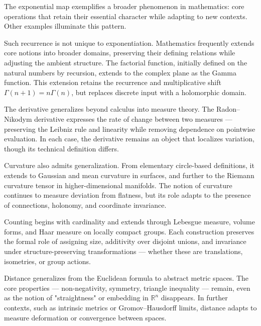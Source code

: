 \begin{commentary}[Generalizations]
The exponential map exemplifies a broader phenomenon in mathematics: core operations that retain their essential character while adapting to new contexts. Other examples illuminate this pattern.

Such recurrence is not unique to exponentiation. Mathematics frequently extends core notions into broader domains, preserving their defining relations while adjusting the ambient structure. The factorial function, initially defined on the natural numbers by recursion, extends to the complex plane as the Gamma function. This extension retains the recurrence and multiplicative shift \( \Gamma(n+1) = n\Gamma(n) \), but replaces discrete input with a holomorphic domain.

The derivative generalizes beyond calculus into measure theory. The Radon–Nikodym derivative expresses the rate of change between two measures — preserving the Leibniz rule and linearity while removing dependence on pointwise evaluation. In each case, the derivative remains an object that localizes variation, though its technical definition differs.

Curvature also admits generalization. From elementary circle-based definitions, it extends to Gaussian and mean curvature in surfaces, and further to the Riemann curvature tensor in higher-dimensional manifolds. The notion of curvature continues to measure deviation from flatness, but its role adapts to the presence of connections, holonomy, and coordinate invariance.

Counting begins with cardinality and extends through Lebesgue measure, volume forms, and Haar measure on locally compact groups. Each construction preserves the formal role of assigning size, additivity over disjoint unions, and invariance under structure-preserving transformations — whether these are translations, isometries, or group actions.

Distance generalizes from the Euclidean formula to abstract metric spaces. The core properties — non-negativity, symmetry, triangle inequality — remain, even as the notion of "straightness" or embedding in $\mathbb{R}^n$ disappears. In further contexts, such as intrinsic metrics or Gromov–Hausdorff limits, distance adapts to measure deformation or convergence between spaces.

\end{commentary}

\vspace{1em}

